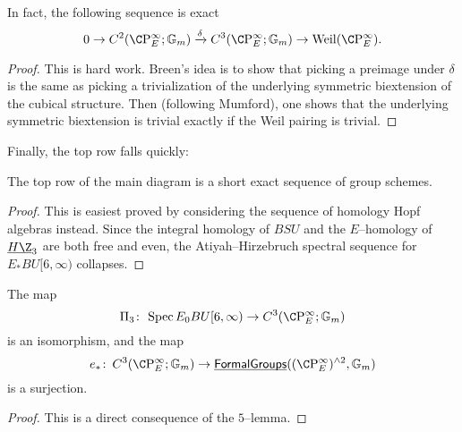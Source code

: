 \begin{lemma}
In fact, the following sequence is exact \[0 \to C^2(\CP^\infty_E; \Gm) \xrightarrow\delta C^3(\CP^\infty_E; \Gm) \to \Weil(\CP^\infty_E).\]
\end{lemma}
\begin{proof}
This is hard work.  Breen's idea is to show that picking a preimage under $\delta$ is the same as picking a trivialization of the underlying symmetric biextension of the cubical structure.  Then (following Mumford), one shows that the underlying symmetric biextension is trivial exactly if the Weil pairing is trivial.
\end{proof}

Finally, the top row falls quickly:

\begin{lemma}
The top row of the main diagram is a short exact sequence of group schemes.
\end{lemma}
\begin{proof}
This is easiest proved by considering the sequence of homology Hopf algebras instead.  Since the integral homology of $BSU$ and the $E$--homology of $\OS{H\Z}{3}$ are both free and even, the Atiyah--Hirzebruch spectral sequence for $E_* BU[6, \infty)$ collapses.
\end{proof}

\begin{corollary}
The map \[\Pi_3\co \Spec E_0 BU[6, \infty) \to C^3(\CP^\infty_E; \Gm)\] is an isomorphism, and the map \[e_*\co C^3(\CP^\infty_E; \Gm) \to \InternalHom{FormalGroups}((\CP^\infty_E)^{\wedge 2}, \Gm)\] is a surjection.
\end{corollary}
\begin{proof}
This is a direct consequence of the $5$--lemma.
\end{proof}









